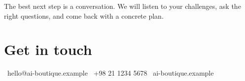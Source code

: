 
The best next step is a conversation. We will listen to your challenges, ask
the right questions, and come back with a concrete plan.

\section{Get in touch}
\begin{center}
\end{center}

\vspace{1.8em}
\begin{center}
  \Large
  \faEnvelope\ hello@ai-boutique.example \quad
  \faPhone\ +98 21 1234 5678 \quad
  \faGlobe\ ai-boutique.example
\end{center}

\vspace{2em}
\begin{center}
\end{center}
